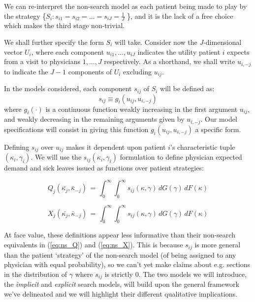 \documentclass[../main.tex]{subfiles}
\begin{document}
We can re-interpret the non-search model as each patient being made to play by the strategy \{$S_i: s_{i1} = s_{i2} = ... = s_{iJ} = \frac{1}{J}$ \}, and it is the lack of a free choice which makes the third stage non-trivial.

We shall further specify the form $S_i$ will take. Consider now the $J$-dimensional vector $U_i$, where each component $u_{i1}, ... , u_{iJ}$ indicates the utility patient $i$ expects from a visit to physicians $1, ..., J$ respectively. As a shorthand, we shall write $u_{i,-j}$ to indicate the $J - 1$ components of $U_i$ excluding $u_{ij}$.

In the models considered, each component $s_{ij}$ of $S_i$ will be defined as:
\[s_{ij} \equiv g_i(u_{ij}, u_{i,-j})\]
where $g_i(\cdot)$ is a continuous function weakly increasing in the first argument $u_{ij}$, and weakly decreasing in the remaining arguments given by $u_{i,-j}$. Our model specifications will consist in giving this function $g_i(u_{ij}, u_{i,-j})$ a specific form.

Defining $s_{ij}$ over $u_{ij}$ makes it dependent upon patient $i$'s characteristic tuple $(\kappa_i, \gamma_i)$. We will use the $s_{ij}(\kappa_i, \gamma_i)$ formulation to define physician expected demand and sick leaves issued as functions over patient strategies:

\begin{equation}
    Q_j(\bar{\kappa_j}, \bar{\kappa}_{-j}) \,=\, \int_{0}^{\infty} \int_{0}^{\infty}s_{ij}(\kappa, \gamma) \,dG(\gamma) \,dF(\kappa)
    \label{eq:s_Q}
\end{equation}

\begin{equation}
    X_j(\bar{\kappa_j}, \bar{\kappa}_{-j}) \,=\, \int_{\bar{0}}^{\infty} \int_{0}^{\infty}s_{ij}(\kappa, \gamma)  \,dG(\gamma) \,dF(\kappa)
    \label{eq:s_X}
\end{equation}

At face value, these definitions appear less informative than their non-search equivalents in (\ref{eq:ns_Q}) and (\ref{eq:ns_X}). This is because $s_{ij}$ is more general than the patient `strategy' of the non-search model (of being assigned to any physician with equal probability), so we can't yet make claims about e.g. sections in the distribution of $\gamma$ where $s_{ij}$ is strictly 0. The two models we will introduce, the \textit{implicit} and \textit{explicit} search models, will build upon the general framework we've delineated and we will highlight their different qualitative implications.
\end{document}
